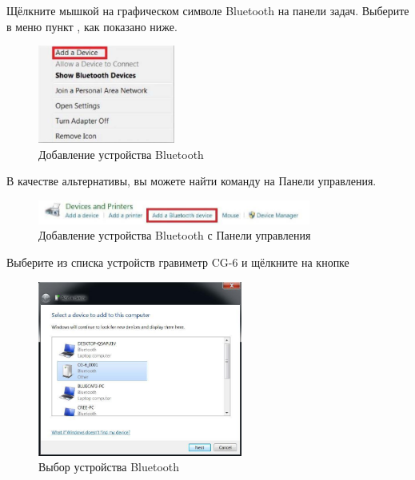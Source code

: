 Щёлкните мышкой на графическом символе Bluetooth \faBluetooth{} на панели задач.
Выберите в меню пункт , как показано ниже.

\begin{figure}[H]
  \centering
  \includegraphics[width=0.4\textwidth]{figures/adding_a_bluetooth_device}
  \caption{Добавление устройства Bluetooth}
  \label{fig:adding_a_bluetooth_device}
\end{figure}

В качестве альтернативы, вы можете найти команду  на
Панели управления.

\begin{figure}[H]
  \centering
  \includegraphics[width=0.8\textwidth]{figures/adding_a_bluetooth_device_from_the_control_panel}
  \caption{Добавление устройства Bluetooth с Панели управления}
  \label{fig:adding_a_bluetooth_device_from_the_control_panel}
\end{figure}

Выберите из списка устройств гравиметр CG-6 и щёлкните на кнопке 

\begin{figure}[H]
  \centering
  \includegraphics[width=0.6\textwidth]{figures/selecting_a_bluetooth_device}
  \caption{Выбор устройства Bluetooth}
  \label{fig:selecting_a_bluetooth_device}
\end{figure}


